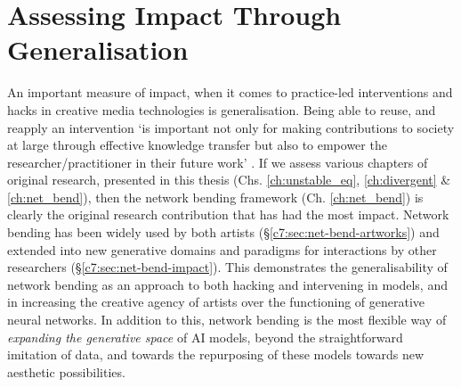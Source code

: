 \section{Assessing Impact Through Generalisation}
\label{c8:sec:generalisation}

An important measure of impact, when it comes to practice-led interventions and hacks in creative media technologies is generalisation.
Being able to reuse, and reapply an intervention `is important not only for making contributions to society at large through effective knowledge transfer but also to empower the researcher/practitioner in their future work' \citep{brown2009integrating}.
If we assess various chapters of original research, presented in this thesis (Chs. \ref{ch:unstable_eq}, \ref{ch:divergent} \& \ref{ch:net_bend}), then the network bending framework (Ch. \ref{ch:net_bend}) is clearly the original research contribution that has had the most impact. 
Network bending has been widely used by both artists (\S \ref{c7:sec:net-bend-artworks}) and extended into new generative domains and paradigms for interactions by other researchers (\S \ref{c7:sec:net-bend-impact}).
This demonstrates the generalisability of network bending as an approach to both hacking and intervening in models, and in increasing the creative agency of artists over the functioning of generative neural networks.
In addition to this, network bending is the most flexible way of \textit{expanding the generative space} of AI models, beyond the straightforward imitation of data, and towards the repurposing of these models towards new aesthetic
possibilities. 

